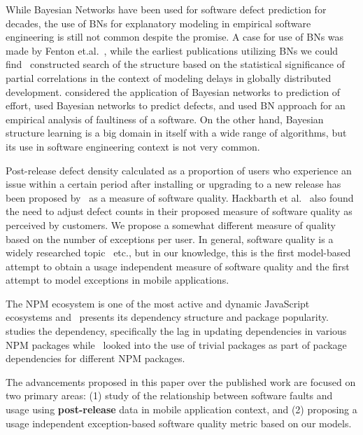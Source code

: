 \documentclass[smallextended]{svjour3}       %
\begin{document}
While Bayesian Networks have been used for software defect prediction 
for decades, the use of BNs for explanatory modeling in
empirical software engineering is still not common despite the
promise. A case for use of BNs was made
by Fenton et.al.~\cite{fenton1999critique,fenton2002software}, while the earliest publications
utilizing BNs we could find~\cite{HM03a} constructed search of the
structure based on the statistical significance of partial
correlations in the context of modeling delays in globally
distributed development. \cite{stamelos2003use,pendharkar2005probabilistic} considered
the application of Bayesian networks to prediction of effort, 
\cite{fenton2007predicting,neil1996predicting,okutan2014software} 
used Bayesian networks to predict defects, and \cite{pai2007empirical} 
used BN approach for an empirical analysis of faultiness of a software. 
On the other hand, Bayesian structure learning is a big domain in itself 
with a wide range of algorithms, but its use in software engineering context 
is not very common.

Post-release defect density calculated as a proportion of users who experience an issue within a certain period after installing or upgrading to a new release has been proposed by~\cite{mockus2008interval,mockus2005predictors} as a measure of software quality.  Hackbarth et al.~\cite{hackbarth2016improving} also found the need to adjust defect counts in their proposed measure of software quality as perceived by customers. We propose a somewhat different measure of quality based on the number of exceptions per user. In general, software quality is a widely researched topic~\cite{kan2002metrics,kitchenham1996software,schulmeyer1992handbook} etc., but in our knowledge, this is the first model-based attempt to obtain a usage independent measure of software quality and the first attempt to model exceptions in mobile applications.

The NPM ecosystem is one of the most active and dynamic JavaScript ecosystems and~\cite{wittern2016look} presents its dependency structure and package popularity.~\cite{zerouali2018empirical} studies the dependency, specifically the lag in updating dependencies in various NPM packages while~\cite{abdalkareem2017developers} looked into the use of trivial packages as part of package dependencies for different NPM packages. 


The advancements proposed in this paper over the published work are focused 
on two primary areas: (1) study of the relationship between software faults and usage 
using \textbf{post-release} data in mobile application context, and (2) proposing a usage independent exception-based software quality metric based on our models.
\end{document}
